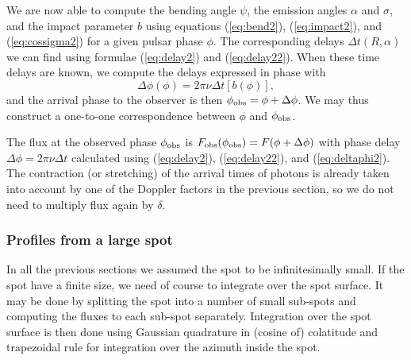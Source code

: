 \documentclass{wihuri}
\def\be{\begin{equation}}
\def\ee{\end{equation}}
\def\phiobs{\phi_{\rm obs}}
\begin{document}
We are now able to compute the bending angle $\psi$, the emission angles $\alpha$ and $\sigma$, and the impact parameter $b$ using equations (\ref{eq:bend2}), (\ref{eq:impact2}), and (\ref{eq:cossigma2}) for a given pulsar phase $\phi$. The corresponding delays $\Delta t(R,\alpha)$   we can find using formulae (\ref{eq:delay2}) and (\ref{eq:delay22}). When these time delays are known, we compute the delays expressed in phase with 
\be \label{eq:deltaphi2}
\Delta \phi(\phi) =2\pi\nu \Delta t[b(\phi)],
\ee
and the arrival phase to the observer is then $\phiobs=\phi+ \Delta\phi$. We may thus construct a one-to-one correspondence between $\phi$ and $\phiobs$.

The flux at the observed phase $\phiobs$ is
${F}_{\rm obs}(\phiobs)=F(\phi+\Delta\phi)$ with
phase delay  $\Delta \phi=2\pi\nu\Delta t$
calculated using (\ref{eq:delay2}), (\ref{eq:delay22}), and (\ref{eq:deltaphi2}).
The contraction (or stretching) of the arrival times of photons is already taken into account by one of the Doppler factors in the previous section, so we do not need to multiply flux again by $\delta$. 




\subsubsection{Profiles from a large spot} 

In all the previous sections we assumed the spot to be infinitesimally small. If the spot have a finite size, we need of course to integrate over the spot surface. It may be done by splitting the spot into a number of small sub-spots and computing the fluxes to each sub-spot separately. Integration over the spot surface is then done using Gaussian quadrature in (cosine of) colatitude and trapezoidal rule for integration over the azimuth inside the spot. 
\end{document}

